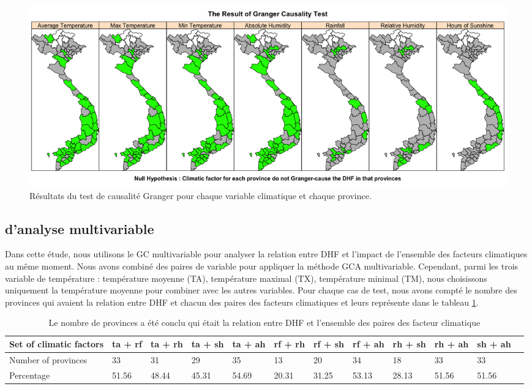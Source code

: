 \begin{figure}[h]
\includegraphics[width = \linewidth]{../figures/chap5/Pic5_1.png}
\caption{Résultats du test de causalité Granger pour chaque variable climatique et chaque province.}
\label{Pic5_1}	
\end{figure}

\subsection{\Rs d'analyse multivariable}
Dans cette étude, nous utilisons le GC multivariable pour analyser la relation entre DHF et l'impact de l'ensemble des facteurs climatiques au même moment. Nous avons combiné des paires de variable pour appliquer la méthode GCA multivariable. Cependant, parmi les trois variable de température : température moyenne (TA), température maximal (TX), température minimal (TM), nous choisissons uniquement la température moyenne pour combiner avec les autres variables. Pour chaque cas de test, nous avons compté le nombre des provinces qui avaient la relation entre DHF et chacun des paires des facteurs climatiques et leurs représente dans le tableau \ref{table2}. 

\begin{table}[h]
\begin{tabular} { | p{1.9cm} |  p{0.9cm} | p{0.9cm} | p{0.9cm} | p{0.9cm} | p{0.9cm} | p{0.9cm} | p{0.9cm} | p{0.9cm} | p{0.9cm} | p{0.9cm} | p{0.9cm} |}
\hline
Set of climatic factors & ta + rf & ta + rh & ta + sh & ta + ah & rf + rh & rf + sh & rf + ah & rh + sh & rh + ah & sh + ah \\
\hline
Number of provinces & 33 & 31 & 29 & 35 & 13 & 20 & 34 & 18 & 33 & 33 \\
\hline
Percentage & 51.56 & 48.44 & 45.31 & 54.69 & 20.31 & 31.25 & 53.13 & 28.13 & 51.56 & 51.56 \\
\hline
\end{tabular}
\caption{Le nombre de provinces a été conclu qui était la relation entre DHF et l'ensemble des paires des facteur climatique} 
\label{table2}
\end{table}

